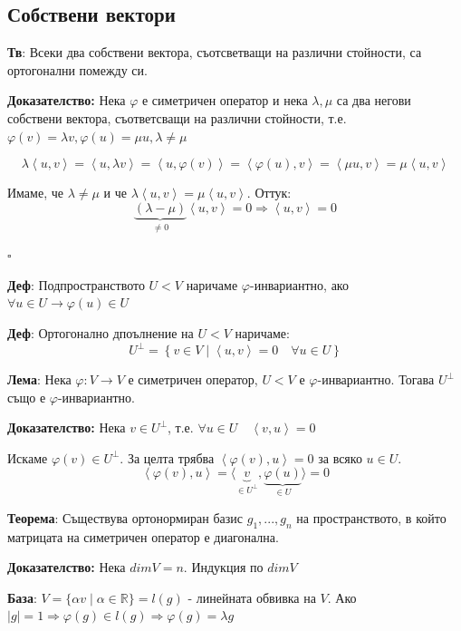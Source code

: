 \documentclass{article}
\renewcommand{\\}{\newline}
\newcommand{\sep}{\;|\;}
\newcommand{\doc}{\textbf{Доказателство: }}
\newcommand{\proven}{\hfill $\square$}
\begin{document}
\subsection{Собствени вектори}

\textbf{Тв}: Всеки два собствени вектора, съотсветващи на различни стойности, са ортогонални помежду си.

\doc Нека \(\varphi\) е симетричен оператор и нека \(\lambda, \mu\) са два негови собствени вектора, съответсващи на различни стойности, т.е. \(\varphi(v) = \lambda v, \varphi(u) = \mu u, \lambda \not=\mu\)    

\[
  \lambda \left\langle u, v\right\rangle = \left\langle u, \lambda v\right\rangle = \left\langle u, \varphi(v)\right\rangle = \left\langle \varphi(u), v\right\rangle = \left\langle \mu u, v\right\rangle = \mu \left\langle u, v\right\rangle
\] 

Имаме, че \(\lambda \not= \mu\) и че \(\lambda \left\langle u, v\right\rangle = \mu \left\langle u, v\right\rangle\). Оттук: \[
\underbrace{(\lambda - \mu)}_{\not=0} \left\langle u, v\right\rangle = 0 \Rightarrow \left\langle u, v\right\rangle = 0
\]   

\proven

\textbf{Деф}: Подпространството \(U < V\) наричаме \(\varphi\)-инвариантно, ако \(\forall u \in U \rightarrow \varphi(u) \in U\) 

\textbf{Деф}: Ортогонално дпоълнение на \(U < V\) наричаме: \[
  U^{\perp}= \left\{v \in V \sep \left\langle u, v\right\rangle = 0 \quad \forall u \in U\right\}
\] 

\textbf{Лема}: Нека \(\varphi: V \to V\) е симетричен оператор, \(U < V\) е \(\varphi\)-инвариантно. Тогава \(U^{\perp}\) също е \(\varphi\)-инвариантно.     

\doc Нека \(v \in U^{\perp}\), т.е. \(\forall u \in U \quad \left\langle v, u\right\rangle = 0\) 

Искаме \(\varphi(v) \in U^{\perp}\). За целта трябва \(\left\langle \varphi(v), u\right\rangle = 0\) за всяко \(u \in U\). \[
  \left\langle \varphi(v), u\right\rangle = \langle \underbrace{v}_{\in U^{\perp}}, \underbrace{\varphi(u)}_{\in U} \rangle= 0
\]   

\textbf{Теорема}: Съществува ортонормиран базис \(g_1, ..., g_n\) на пространството, в който матрицата на симетричен оператор е диагонална. 

%
\doc Нека \(dimV = n\). Индукция по \(dim V\) 

\textbf{База}: \(V = \{\alpha v \sep \alpha \in \mathbb{R}\} = l(g)\) - линейната обвивка на \(V\). Ако \(\left|g\right| = 1 \Rightarrow \varphi(g) \in l(g) \Rightarrow \varphi(g) = \lambda g\) 
\end{document}
